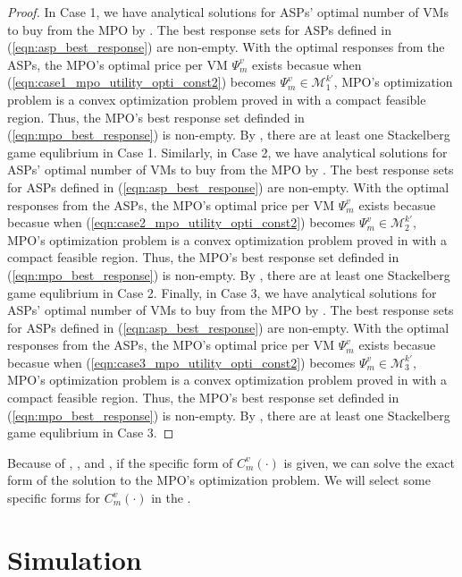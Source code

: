 \documentclass[conference]{IEEEtran}
\begin{document}
\begin{proof}
In Case 1, we have analytical solutions for ASPs' optimal number of VMs to buy from the MPO by . The best response sets for ASPs defined in (\ref{eqn:asp_best_response}) are non-empty. With the optimal responses from the ASPs, the MPO's optimal price per VM $\Psi_m^v$ exists becasue when (\ref{eqn:case1_mpo_utility_opti_const2}) becomes $\Psi_m^v \in \mathcal{M}_1^{k'}$, MPO's optimization problem is a convex optimization problem proved in  with a compact feasible region. Thus, the MPO's best response set definded in (\ref{eqn:mpo_best_response}) is non-empty. By , there are at least one Stackelberg game equlibrium in Case 1. Similarly, in Case 2, we have analytical solutions for ASPs' optimal number of VMs to buy from the MPO by . The best response sets for ASPs defined in (\ref{eqn:asp_best_response}) are non-empty. With the optimal responses from the ASPs, the MPO's optimal price per VM $\Psi_m^v$ exists becasue becasue when (\ref{eqn:case2_mpo_utility_opti_const2}) becomes $\Psi_m^v \in \mathcal{M}_2^{k'}$, MPO's optimization problem is a convex optimization problem proved in  with a compact feasible region. Thus, the MPO's best response set definded in (\ref{eqn:mpo_best_response}) is non-empty. By , there are at least one Stackelberg game equlibrium in Case 2. Finally, in Case 3, we have analytical solutions for ASPs' optimal number of VMs to buy from the MPO by . The best response sets for ASPs defined in (\ref{eqn:asp_best_response}) are non-empty. With the optimal responses from the ASPs, the MPO's optimal price per VM $\Psi_m^v$ exists becasue becasue when (\ref{eqn:case3_mpo_utility_opti_const2}) becomes $\Psi_m^v \in \mathcal{M}_3^{k'}$, MPO's optimization problem is a convex optimization problem proved in  with a compact feasible region. Thus, the MPO's best response set definded in (\ref{eqn:mpo_best_response}) is non-empty. By , there are at least one Stackelberg game equlibrium in Case 3.
\end{proof}
Because of , , and , if the specific form of $C_m^v(\cdot)$ is given, we can solve the exact form of the solution to the MPO's optimization problem. We will select some specific forms for $C_m^v(\cdot)$ in the .
\section{Simulation} \label{sec:simulation} 


\end{document}
